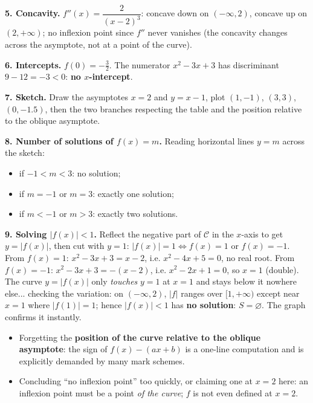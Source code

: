 \documentclass[11pt]{article}
\begin{document}
\begin{exoresolu}[Complete study of $f(x) = \dfrac{x^{2} - 3x + 3}{x - 2}$]
\textbf{5. Concavity.} $f''(x) = \dfrac{2}{(x-2)^{3}}$: concave down on $(-\infty, 2)$, concave up on $(2, +\infty)$; no inflexion point since $f''$ never vanishes (the concavity changes across the asymptote, not at a point of the curve).

\textbf{6. Intercepts.} $f(0) = -\tfrac{3}{2}$. The numerator $x^{2} - 3x + 3$ has discriminant $9 - 12 = -3 < 0$: \textbf{no $x$-intercept}.

\textbf{7. Sketch.} Draw the asymptotes $x = 2$ and $y = x - 1$, plot $(1, -1)$, $(3, 3)$, $(0, -1.5)$, then the two branches respecting the table and the position relative to the oblique asymptote.

\textbf{8. Number of solutions of $f(x) = m$.} Reading horizontal lines $y = m$ across the sketch:
\begin{itemize}
\item if $-1 < m < 3$: no solution;
\item if $m = -1$ or $m = 3$: exactly one solution;
\item if $m < -1$ or $m > 3$: exactly two solutions.
\end{itemize}

\textbf{9. Solving $|f(x)| < 1$.} Reflect the negative part of $\mathcal{C}$ in the $x$-axis to get $y = |f(x)|$, then cut with $y = 1$: $|f(x)| = 1 \iff f(x) = 1$ or $f(x) = -1$. From $f(x) = 1$: $x^{2} - 3x + 3 = x - 2$, i.e. $x^{2} - 4x + 5 = 0$, no real root. From $f(x) = -1$: $x^{2} - 3x + 3 = -(x - 2)$, i.e. $x^{2} - 2x + 1 = 0$, so $x = 1$ (double). The curve $y = |f(x)|$ only \emph{touches} $y = 1$ at $x = 1$ and stays below it nowhere else... checking the variation: on $(-\infty, 2)$, $|f|$ ranges over $[1, +\infty)$ except near $x=1$ where $|f(1)| = 1$; hence $|f(x)| < 1$ has \textbf{no solution}: $S = \varnothing$. The graph confirms it instantly.
\end{exoresolu}

\begin{attention}
\begin{itemize}
\item Forgetting the \textbf{position of the curve relative to the oblique asymptote}: the sign of $f(x) - (ax + b)$ is a one-line computation and is explicitly demanded by many mark schemes.
\item Concluding ``no inflexion point'' too quickly, or claiming one at $x = 2$ here: an inflexion point must be a point \emph{of the curve}; $f$ is not even defined at $x = 2$.
\end{itemize}
\end{attention}
\end{document}
